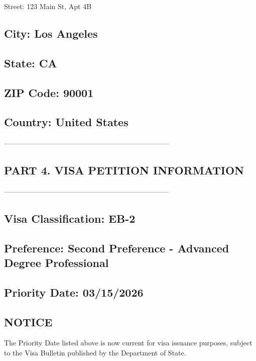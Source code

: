 Street: 123 Main St, Apt 4B

\subsection*{City: Los Angeles}

\subsection*{State: CA}

\subsection*{ZIP Code: 90001}

\subsection*{Country: United States}

-----------------------------------------------------------------------

\subsection*{PART 4. VISA PETITION INFORMATION}

-----------------------------------------------------------------------

\subsection*{Visa Classification: EB-2}

\subsection*{Preference: Second Preference - Advanced Degree Professional}

\subsection*{Priority Date: 03/15/2026}

\subsection*{NOTICE}

The Priority Date listed above is now current for visa issuance purposes, subject to the Visa Bulletin published by the Department of State.

